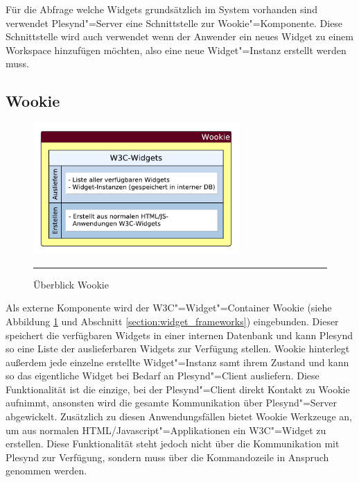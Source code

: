 Für die Abfrage welche Widgets grundsätzlich im System vorhanden sind verwendet Plesynd"=Server eine Schnittstelle zur Wookie"=Komponente. Diese Schnittstelle wird auch verwendet wenn der Anwender ein neues Widget zu einem Workspace hinzufügen möchten, also eine neue Widget"=Instanz erstellt werden muss.

\subsection{Wookie}\label{section:loesung_wookie}
\begin{figure}[ht]
  \centering
  \includegraphics[height=5cm,keepaspectratio]{./Figures/konzeptionelle_loesung_wookie.pdf}
    \rule{35em}{0.5pt}
  \caption[Überblick Wookie]{Überblick Wookie}
  \label{fig:ueberblick_wookie}
\end{figure}
Als externe Komponente wird der W3C"=Widget"=Container Wookie (siehe Abbildung \ref{fig:ueberblick_wookie} und Abschnitt \ref{section:widget_frameworks}) eingebunden. Dieser speichert die verfügbaren Widgets in einer internen Datenbank und kann Plesynd so eine Liste der auslieferbaren Widgets zur Verfügung stellen. Wookie hinterlegt außerdem jede einzelne erstellte Widget"=Instanz samt ihrem Zustand und kann so das eigentliche Widget bei Bedarf an Plesynd"=Client ausliefern. Diese Funktionalität ist die einzige, bei der Plesynd"=Client direkt Kontakt zu Wookie aufnimmt, ansonsten wird die gesamte Kommunikation über Plesynd"=Server abgewickelt. Zusätzlich zu diesen Anwendungsfällen bietet Wookie Werkzeuge an, um aus normalen HTML/Javascript"=Applikationen ein W3C"=Widget zu erstellen. Diese Funktionalität steht jedoch nicht über die Kommunikation mit Plesynd zur Verfügung, sondern muss über die Kommandozeile in Anspruch genommen werden.

